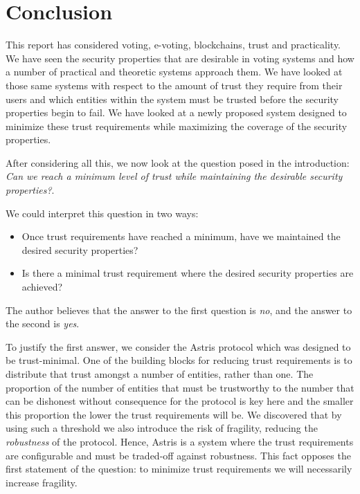 \chapter{Conclusion}
\label{ch:conclusion}

This report has considered voting, e-voting, blockchains, trust and practicality. We have seen the security properties that are desirable in voting systems and how a number of practical and theoretic systems approach them. We have looked at those same systems with respect to the amount of trust they require from their users and which entities within the system must be trusted before the security properties begin to fail. We have looked at a newly proposed system designed to minimize these trust requirements while maximizing the coverage of the security properties.

After considering all this, we now look at the question posed in the introduction: \emph{Can we reach a minimum level of trust while maintaining the desirable security properties?}.

We could interpret this question in two ways:

\begin{itemize}
    \item Once trust requirements have reached a minimum, have we maintained the desired security properties?
    \item Is there a minimal trust requirement where the desired security properties are achieved?
\end{itemize}

The author believes that the answer to the first question is \emph{no}, and the answer to the second is \emph{yes}.

To justify the first answer, we consider the Astris protocol which was designed to be trust-minimal. One of the building blocks for reducing trust requirements is to distribute that trust amongst a number of entities, rather than one. The proportion of the number of entities that must be trustworthy to the number that can be dishonest without consequence for the protocol is key here and the smaller this proportion the lower the trust requirements will be. We discovered that by using such a threshold we also introduce the risk of fragility, reducing the \emph{robustness} of the protocol. Hence, Astris is a system where the trust requirements are configurable and must be traded-off against robustness. This fact opposes the first statement of the question: to minimize trust requirements we will necessarily increase fragility.

